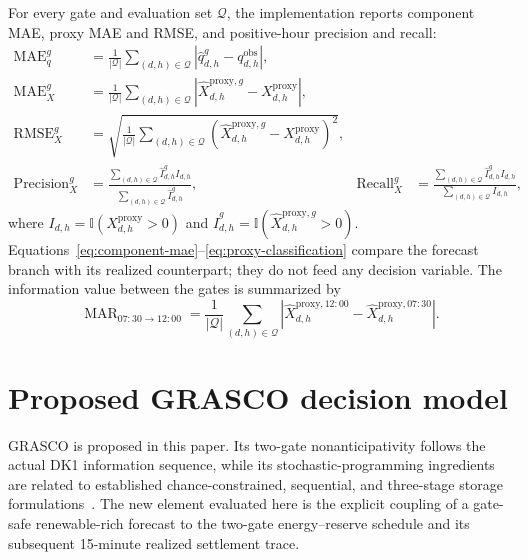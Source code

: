 \documentclass[11pt,a4paper]{article}
\begin{document}
For every gate and evaluation set $\mathcal{Q}$, the implementation reports
component MAE, proxy MAE and RMSE, and positive-hour precision and recall:
\begin{align}
  \operatorname{MAE}^{g}_{q}
  &=\frac{1}{|\mathcal{Q}|}\sum_{(d,h)\in\mathcal{Q}}
  \left|\widehat q^{g}_{d,h}-q^{\mathrm{obs}}_{d,h}\right|,
  \label{eq:component-mae}\\
  \operatorname{MAE}^{g}_{X}
  &=\frac{1}{|\mathcal{Q}|}\sum_{(d,h)\in\mathcal{Q}}
  \left|\widehat X^{\mathrm{proxy},g}_{d,h}
  -X^{\mathrm{proxy}}_{d,h}\right|,
  \label{eq:proxy-mae}\\
  \operatorname{RMSE}^{g}_{X}
  &=\sqrt{\frac{1}{|\mathcal{Q}|}\sum_{(d,h)\in\mathcal{Q}}
  \left(\widehat X^{\mathrm{proxy},g}_{d,h}
  -X^{\mathrm{proxy}}_{d,h}\right)^2},
  \label{eq:proxy-rmse}\\
  \operatorname{Precision}^{g}_{X}
  &=\frac{\sum_{(d,h)\in\mathcal Q}\widehat I^{g}_{d,h}I_{d,h}}
  {\sum_{(d,h)\in\mathcal Q}\widehat I^{g}_{d,h}},
  &\operatorname{Recall}^{g}_{X}
  &=\frac{\sum_{(d,h)\in\mathcal Q}\widehat I^{g}_{d,h}I_{d,h}}
  {\sum_{(d,h)\in\mathcal Q}I_{d,h}},
  \label{eq:proxy-classification}
\end{align}
where $I_{d,h}=\mathbb{I}(X^{\mathrm{proxy}}_{d,h}>0)$ and
$\widehat I^{g}_{d,h}=\mathbb{I}(\widehat X^{\mathrm{proxy},g}_{d,h}>0)$.
Equations~\eqref{eq:component-mae}--\eqref{eq:proxy-classification} compare
the forecast branch with its realized counterpart; they do not feed any
decision variable.
The information value between the gates is summarized by
\begin{equation}
  \operatorname{MAR}_{07{:}30\rightarrow12{:}00}
  =\frac{1}{|\mathcal{Q}|}\sum_{(d,h)\in\mathcal{Q}}
  \left|\widehat X^{\mathrm{proxy},12{:}00}_{d,h}
  -\widehat X^{\mathrm{proxy},07{:}30}_{d,h}\right|.
  \label{eq:gate-revision}
\end{equation}

\section{Proposed GRASCO decision model}
\label{sec:grasco-method}

GRASCO is proposed in this paper.  Its two-gate nonanticipativity follows the
actual DK1 information sequence, while its stochastic-programming ingredients
are related to established chance-constrained, sequential, and three-stage
storage formulations~\cite{toubeau2021,allawati2021,mancini2024}.  The new
element evaluated here is the explicit coupling of a gate-safe renewable-rich
forecast to the two-gate energy--reserve schedule and its subsequent
15-minute realized settlement trace.
\end{document}
